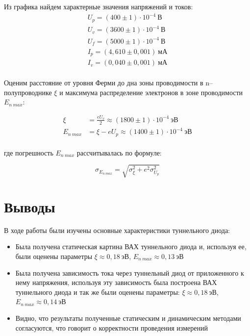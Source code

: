 \documentclass[a4paper,12pt]{article}
\begin{document}
Из графика найдем характерные значения напряжений и токов:
\begin{align*}
	U_p = (400 \pm 1) \cdot 10^{-4} \ В \\
	U_v = (3600 \pm 1) \cdot 10^{-4} \ В \\
	U_f = (5000 \pm 1) \cdot 10^{-4} \ В \\
	I_p = (4,610 \pm 0,001) \ мА \\
	I_v = (0,040 \pm 0,001) \ мА \\ 
\end{align*}

Оценим расстояние от уровня Ферми до дна зоны проводимости в n--полупроводнике $\xi$ и максимума распределение электронов в зоне проводимости $E_{n \ max}$:

\begin{align*}
	\xi &= \frac{eU_v}{2} \approx (1800 \pm 1) \cdot 10^{-4} \ эВ \\
	E_{n \ max} &= \xi - eU_p \approx (1400 \pm 1) \cdot 10^{-4} \ эВ \\
\end{align*}

где погрешность $E_{n \ max}$ рассчитывалась по формуле:

$$
	\sigma_{E_{n \ max}} = \sqrt{ \sigma_{\xi}^2 + e^2 \sigma_{U_p}^2}
$$

\section*{Выводы}

В ходе работы были изучены основные характеристики туннельного диода:

\begin{itemize}
\item Была получена статическая картина ВАХ туннельного диода и, используя ее, были оценены параметры $\xi \approx 0,18 \ эВ$, $E_{n \ max} \approx 0,13 \ эВ$

\item Была получена зависимость тока через туннельный диод от приложенного к нему напряжения, используя эту зависимость была построена ВАХ туннельного диода и так же были оценены параметры: $\xi \approx 0,18 \ эВ$, $E_{n \ max} \approx 0,14 \ эВ$

\item Видно, что результаты полученные статическим и динамическим методами согласуются, что говорит о корректности проведения измерений
\end{itemize}
\end{document}
